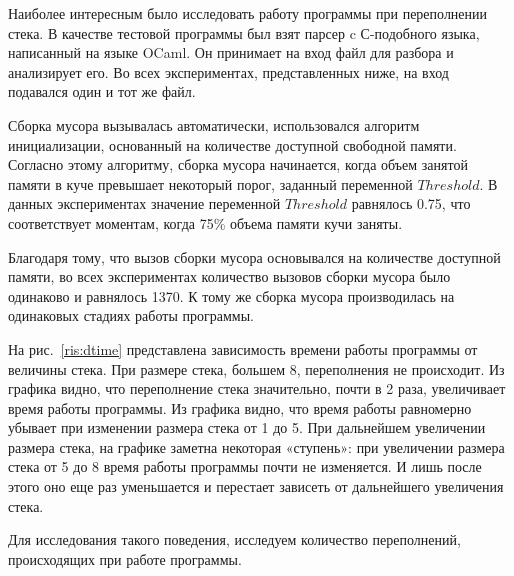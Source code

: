Наиболее интересным было исследовать работу программы при переполнении стека. В качестве тестовой программы был взят парсер c С-подобного языка,
написанный на языке OCaml. Он принимает на вход файл для разбора и анализирует его. Во всех экспериментах, представленных ниже, на вход подавался
один и тот же файл. 

Сборка мусора вызывалась автоматически, использовался алгоритм инициализации, основанный на количестве доступной свободной памяти. Согласно 
этому алгоритму, сборка мусора начинается, когда объем занятой памяти в куче превышает некоторый порог, заданный переменной $Threshold$. В данных 
экспериментах значение переменной $Threshold$ равнялось 0.75, что соответствует моментам, когда 75\% объема памяти кучи заняты.  

Благодаря тому, что вызов сборки мусора основывался на количестве доступной памяти, во всех экспериментах количество вызовов сборки мусора было одинаково и равнялось 
1370. К тому же сборка мусора производилась на одинаковых стадиях работы программы.

На рис.~\ref{ris:dtime} представлена зависимость времени работы программы от
величины стека. При размере стека, большем 8, переполнения не происходит. Из графика видно, что переполнение стека значительно, почти в 2 раза, увеличивает 
время работы программы. Из графика видно, что время работы равномерно убывает при изменении размера стека от 1 до 5. При дальнейшем увеличении размера стека, 
на графике заметна некоторая «ступень»: при увеличении размера стека от 5 до 8 время работы программы почти не изменяется. И лишь после этого оно еще раз уменьшается 
и перестает зависеть от дальнейшего увеличения стека. 

Для исследования такого поведения, исследуем количество переполнений, происходящих при работе программы.

